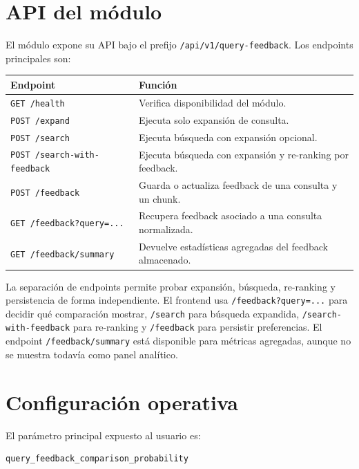 \documentclass[12pt,a4paper]{article}
\begin{document}
\section{API del módulo}

El módulo expone su API bajo el prefijo \texttt{/api/v1/query-feedback}. Los endpoints principales son:

\begin{center}
\begin{tabular}{p{}p{}}
\toprule
\textbf{Endpoint} & \textbf{Función} \\
\midrule
\texttt{GET /health} & Verifica disponibilidad del módulo. \\
\texttt{POST /expand} & Ejecuta solo expansión de consulta. \\
\texttt{POST /search} & Ejecuta búsqueda con expansión opcional. \\
\texttt{POST /search-with-feedback} & Ejecuta búsqueda con expansión y re-ranking por feedback. \\
\texttt{POST /feedback} & Guarda o actualiza feedback de una consulta y un chunk. \\
\texttt{GET /feedback?query=...} & Recupera feedback asociado a una consulta normalizada. \\
\texttt{GET /feedback/summary} & Devuelve estadísticas agregadas del feedback almacenado. \\
\bottomrule
\end{tabular}
\end{center}

La separación de endpoints permite probar expansión, búsqueda, re-ranking y persistencia de forma independiente. El frontend usa \texttt{/feedback?query=...} para decidir qué comparación mostrar, \texttt{/search} para búsqueda expandida, \texttt{/search-with-feedback} para re-ranking y \texttt{/feedback} para persistir preferencias. El endpoint \texttt{/feedback/summary} está disponible para métricas agregadas, aunque no se muestra todavía como panel analítico.

\section{Configuración operativa}

El parámetro principal expuesto al usuario es:

\begin{lstlisting}
query_feedback_comparison_probability
\end{lstlisting}
\end{document}
